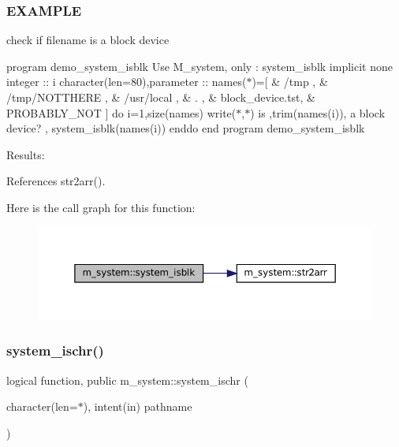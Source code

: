 \subsubsection*{E\+X\+A\+M\+P\+LE}

check if filename is a block device

program demo\+\_\+system\+\_\+isblk Use M\+\_\+system, only \+: system\+\_\+isblk implicit none integer \+:\+: i character(len=80),parameter \+:\+: names($\ast$)=\mbox{[} \& \textquotesingle{}/tmp \textquotesingle{}, \& \textquotesingle{}/tmp/\+N\+O\+T\+T\+H\+E\+RE \textquotesingle{}, \& \textquotesingle{}/usr/local \textquotesingle{}, \& \textquotesingle{}. \textquotesingle{}, \& \textquotesingle{}block\+\_\+device.\+tst\textquotesingle{}, \& \textquotesingle{}P\+R\+O\+B\+A\+B\+L\+Y\+\_\+\+N\+OT \textquotesingle{}\mbox{]} do i=1,size(names) write($\ast$,$\ast$)\textquotesingle{} is \textquotesingle{},trim(names(i)),\textquotesingle{} a block device? \textquotesingle{}, system\+\_\+isblk(names(i)) enddo end program demo\+\_\+system\+\_\+isblk

Results\+: 

References str2arr().

Here is the call graph for this function\+:
\nopagebreak
\begin{figure}[H]
\begin{center}
\leavevmode
\includegraphics[width=350pt]{namespacem__system_a791fa587005ec07cbcd7b0045ee6f43f_cgraph}
\end{center}
\end{figure}
\mbox{\label{namespacem__system_a12a948fa4aacda084a538ae3a5ae3cc6}} 
\subsubsection{\texorpdfstring{system\+\_\+ischr()}{system\_ischr()}}
{\footnotesize\ttfamily logical function, public m\+\_\+system\+::system\+\_\+ischr (\begin{DoxyParamCaption}\item[{character(len=$\ast$), intent(in)}]{pathname }\end{DoxyParamCaption})}




